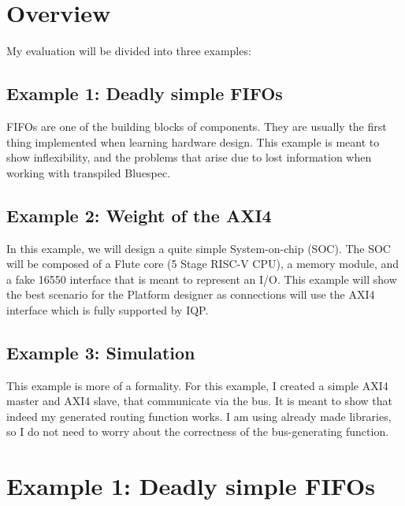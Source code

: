\documentclass[12pt]{report}
\begin{document}
\section{Overview} 
My evaluation will be divided into three examples: 
\subsection{Example 1: Deadly simple FIFOs} FIFOs are one of the building blocks of components. 
They are usually the first thing implemented when learning hardware design.
This example is meant to show inflexibility, and the problems that arise due to lost information when working with transpiled Bluespec. 
\subsection{Example 2: Weight of the AXI4} 
In this example, we will design a quite simple System-on-chip (SOC). 
The SOC will be composed of a Flute core (5 Stage RISC-V CPU), a memory module, and a fake 16550 interface that is meant to represent an I/O. 
This example will show the best scenario for the Platform designer as connections will use the AXI4 interface which is fully supported by IQP.
\subsection{Example 3: Simulation} 
This example is more of a formality. 
For this example, I created a simple AXI4 master and AXI4 slave, that communicate via the bus. 
It is meant to show that indeed my generated routing function works. 
I am using already made libraries, so I do not need to worry about the correctness of the bus-generating function. 
\section{Example 1: Deadly simple FIFOs} 
\end{document}
